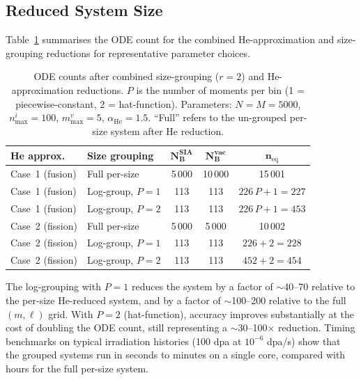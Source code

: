 \subsection{Reduced System Size}
\label{sec:reduced_size}

Table~\ref{tab:reduced_size} summarises the ODE count for the
combined He-approximation and size-grouping reductions for
representative parameter choices.

\begin{table}[htbp]
\centering
\caption{ODE counts after combined size-grouping ($r = 2$) and
He-approximation reductions. $P$ is the number of moments per bin
(1 = piecewise-constant, 2 = hat-function). Parameters:
$N = M = 5000$, $n_{\max}^i = 100$, $m_{\max}^v = 5$,
$\alpha_{\mathrm{He}} = 1.5$. ``Full'' refers to the un-grouped
per-size system after He reduction.}
\label{tab:reduced_size}
\renewcommand{\arraystretch}{1.25}
\begin{tabular}{@{}llccc@{}}
\toprule
\textbf{He approx.} & \textbf{Size grouping}
  & $\mathbf{N_B^{SIA}}$
  & $\mathbf{N_B^{vac}}$
  & $\mathbf{n_{\mathrm{eq}}}$ \\
\midrule
Case~1 (fusion) & Full per-size
  & 5\,000 & 10\,000 & 15\,001 \\
Case~1 (fusion) & Log-group, $P=1$
  & 113 & 113 & $226\,P + 1 = 227$ \\
Case~1 (fusion) & Log-group, $P=2$
  & 113 & 113 & $226\,P + 1 = 453$ \\
Case~2 (fission) & Full per-size
  & 5\,000 & 5\,000 & 10\,002 \\
Case~2 (fission) & Log-group, $P=1$
  & 113 & 113 & $226 + 2 = 228$ \\
Case~2 (fission) & Log-group, $P=2$
  & 113 & 113 & $452 + 2 = 454$ \\
\bottomrule
\end{tabular}
\end{table}

\noindent
The log-grouping with $P=1$ reduces the system by a factor of
$\sim$40--70 relative to the per-size He-reduced system, and by a
factor of $\sim$100--200 relative to the full $(m,\ell)$ grid. With
$P=2$ (hat-function), accuracy improves substantially at the cost of
doubling the ODE count, still representing a $\sim$30--100$\times$
reduction. Timing benchmarks on typical irradiation histories
(100 dpa at $10^{-6}$ dpa/s) show that the grouped systems run in
seconds to minutes on a single core, compared with hours for the
full per-size system.

